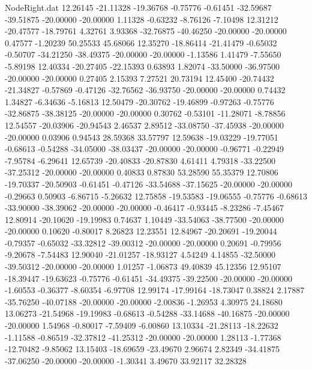 \begin{filecontents}{NodeRight.dat}
  12.26145  -21.11328  -19.36768    -0.75776   -0.61451  -32.59687  -39.51875  -20.00000  -20.00000    1.11328   -0.63232   -8.76126   -7.10498
  12.31212  -20.47577  -18.79761     4.32761    3.93368  -32.76875  -40.46250  -20.00000  -20.00000    0.47577   -1.20239   50.25533   45.68066
  12.35270  -18.86414  -21.41479    -0.65032   -0.50707  -34.21250  -38.49375  -20.00000  -20.00000   -1.13586    1.41479   -7.55650   -5.89198
  12.40334  -20.27405  -22.15393     0.63893    1.82074  -33.50000  -36.97500  -20.00000  -20.00000    0.27405    2.15393    7.27521   20.73194
  12.45400  -20.74432  -21.34827    -0.57869   -0.47126  -32.76562  -36.93750  -20.00000  -20.00000    0.74432    1.34827   -6.34636   -5.16813
  12.50479  -20.30762  -19.46899    -0.97263   -0.75776  -32.86875  -38.38125  -20.00000  -20.00000    0.30762   -0.53101  -11.28071   -8.78856
  12.54557  -20.03906  -20.94543     2.46537    2.89512  -33.08750  -37.45938  -20.00000  -20.00000    0.03906    0.94543   28.59368   33.57797
  12.59638  -19.03229  -19.77051    -0.68613   -0.54288  -34.05000  -38.03437  -20.00000  -20.00000   -0.96771   -0.22949   -7.95784   -6.29641
  12.65739  -20.40833  -20.87830     4.61411    4.79318  -33.22500  -37.25312  -20.00000  -20.00000    0.40833    0.87830   53.28590   55.35379
  12.70806  -19.70337  -20.50903    -0.61451   -0.47126  -33.54688  -37.15625  -20.00000  -20.00000   -0.29663    0.50903   -6.86715   -5.26632
  12.75858  -19.53583  -19.06555    -0.75776   -0.68613  -33.90000  -38.39062  -20.00000  -20.00000   -0.46417   -0.93445   -8.23286   -7.45467
  12.80914  -20.10620  -19.19983     0.74637    1.10449  -33.54063  -38.77500  -20.00000  -20.00000    0.10620   -0.80017    8.26823   12.23551
  12.84967  -20.20691  -19.20044    -0.79357   -0.65032  -33.32812  -39.00312  -20.00000  -20.00000    0.20691   -0.79956   -9.20678   -7.54483
  12.90040  -21.01257  -18.93127     4.54249    4.14855  -32.50000  -39.50312  -20.00000  -20.00000    1.01257   -1.06873   49.40839   45.12356
  12.95107  -18.39447  -19.63623    -0.75776   -0.61451  -34.49375  -39.22500  -20.00000  -20.00000   -1.60553   -0.36377   -8.60354   -6.97708
  12.99174  -17.99164  -18.73047     0.38824    2.17887  -35.76250  -40.07188  -20.00000  -20.00000   -2.00836   -1.26953    4.30975   24.18680
  13.06273  -21.54968  -19.19983    -0.68613   -0.54288  -33.14688  -40.16875  -20.00000  -20.00000    1.54968   -0.80017   -7.59409   -6.00860
  13.10334  -21.28113  -18.22632    -1.11588   -0.86519  -32.37812  -41.25312  -20.00000  -20.00000    1.28113   -1.77368  -12.70482   -9.85062
  13.15403  -18.69659  -23.49670     2.96674    2.82349  -34.41875  -37.06250  -20.00000  -20.00000   -1.30341    3.49670   33.92117   32.28328

\end{filecontents}
